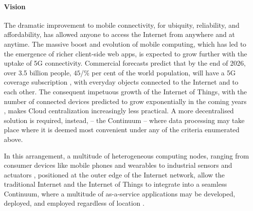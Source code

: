 \paragraph{Vision}
The dramatic improvement to mobile connectivity, for ubiquity, reliability, and affordability, has allowed anyone to access the Internet from anywhere and at anytime.
The massive boost and evolution of mobile computing, which has led to the emergence of richer client-side web apps, is expected to grow further with the uptake of 5G connectivity. 
Commercial forecasts predict that by the end of 2026,  over 3.5 billion people, $45$/\% per cent of the world population, will have a 5G coverage subscription \cite{ericsson-5g}, with everyday objects connected to the Internet and to each other. 
The consequent impetuous growth of the Internet of Things, with the number of connected devices predicted to grow exponentially in the coming years \cite{gartner-iot}, makes Cloud \cite{mell2011nist} centralization increasingly less practical.
A more decentralised solution is required, instead, -- the Continuum -- where data processing may take place where it is deemed most convenient under any of the criteria enumerated above.  

In this arrangement, a multitude of heterogeneous computing nodes, ranging from consumer devices like mobile phones and wearables to industrial sensors and actuators \cite{chen2018edge}, positioned at the outer edge of the Internet network, allow the traditional Internet and the Internet of Things to integrate into a seamless Continuum, where a multitude of as-a-service applications may be developed, deployed, and employed regardless of location \cite{beckman2020harnessing}.

